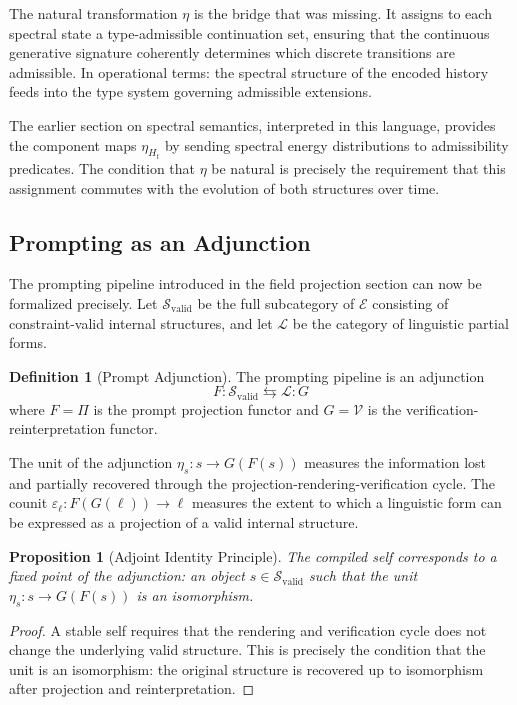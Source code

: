 \documentclass[12pt, a4paper]{article}
\theoremstyle{plain}
\newtheorem{proposition}[theorem]{Proposition}
\theoremstyle{definition}
\newtheorem{definition}[theorem]{Definition}
\theoremstyle{remark}
\begin{document}
The natural transformation $\eta$ is the bridge that was missing. It assigns to each spectral state a type-admissible continuation set, ensuring that the continuous generative signature coherently determines which discrete transitions are admissible. In operational terms: the spectral structure of the encoded history feeds into the type system governing admissible extensions.

The earlier section on spectral semantics, interpreted in this language, provides the component maps $\eta_{H_t}$ by sending spectral energy distributions to admissibility predicates. The condition that $\eta$ be natural is precisely the requirement that this assignment commutes with the evolution of both structures over time.

\subsection{Prompting as an Adjunction}

The prompting pipeline introduced in the field projection section can now be formalized precisely. Let $\mathcal{S}_{\mathrm{valid}}$ be the full subcategory of $\mathcal{E}$ consisting of constraint-valid internal structures, and let $\mathcal{L}$ be the category of linguistic partial forms.

\begin{definition}[Prompt Adjunction]
The prompting pipeline is an adjunction
\[
F : \mathcal{S}_{\mathrm{valid}} \leftrightarrows \mathcal{L} : G
\]
where $F = \Pi$ is the prompt projection functor and $G = \mathcal{V}$ is the verification-reinterpretation functor.
\end{definition}

The unit of the adjunction $\eta_s : s \to G(F(s))$ measures the information lost and partially recovered through the projection-rendering-verification cycle. The counit $\varepsilon_\ell : F(G(\ell)) \to \ell$ measures the extent to which a linguistic form can be expressed as a projection of a valid internal structure.

\begin{proposition}[Adjoint Identity Principle]
The compiled self corresponds to a fixed point of the adjunction: an object $s \in \mathcal{S}_{\mathrm{valid}}$ such that the unit $\eta_s : s \to G(F(s))$ is an isomorphism.
\end{proposition}

\begin{proof}
A stable self requires that the rendering and verification cycle does not change the underlying valid structure. This is precisely the condition that the unit is an isomorphism: the original structure is recovered up to isomorphism after projection and reinterpretation.
\end{proof}
\end{document}
